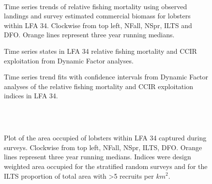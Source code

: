 \documentclass[11pt]{article}
\newcommand{\e}{/SpinDr/backup/bio_data/bio.lobster/figures/LFA3438Framework2019/} %
\begin{document}
\begin{figure}
        \centering
    \\
        
         \caption{Time series trends of relative fishing mortality using observed landings and survey estimated commercial biomass for lobsters within LFA 34. Clockwise from top left, NFall, NSpr, ILTS and DFO. Orange lines represent three year running medians.}
        \end{figure}

   \begin{figure}
    \centering
        \caption{Time series states in LFA 34 relative fishing mortality and CCIR exploitation from Dynamic Factor analyses.}

    \end{figure}

\begin{figure}
    \centering
        \caption{Time series trend fits with confidence intervals from Dynamic Factor analyses of the relative fishing mortality and CCIR exploitation indices in LFA 34.}

    \end{figure}



    
\begin{figure}
        \centering
    \\
                \\
        
         \caption{Plot of the area occupied of lobsters within LFA 34 captured during surveys. Clockwise from top left, NFall, NSpr, ILTS, DFO.
         Orange lines represent three year running medians. Indices were design weighted area occupied for the stratified random surveys and for the ILTS proportion of total area with \textgreater 5 recruits per $km^2$.}
        \end{figure}
\end{document}
